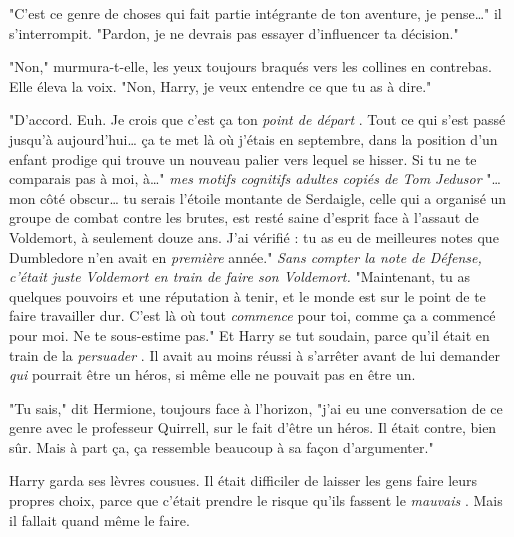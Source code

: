 "C'est ce genre de choses qui fait partie intégrante de ton aventure, je pense…" il s'interrompit. "Pardon, je ne devrais pas essayer d'influencer ta décision."

"Non," murmura-t-elle, les yeux toujours braqués vers les collines en contrebas. Elle éleva la voix. "Non, Harry, je veux entendre ce que tu as à dire."

"D'accord. Euh. Je crois que c'est ça ton \emph{point de départ} . Tout ce qui s'est passé jusqu'à aujourd'hui… ça te met là où j'étais en septembre, dans la position d'un enfant prodige qui trouve un nouveau palier vers lequel se hisser. Si tu ne te comparais pas à moi, à…" \emph{mes motifs cognitifs adultes copiés de Tom Jedusor}  "… mon côté obscur… tu serais l'étoile montante de Serdaigle, celle qui a organisé un groupe de combat contre les brutes, est resté saine d'esprit face à l'assaut de Voldemort, à seulement douze ans. J'ai vérifié : tu as eu de meilleures notes que Dumbledore n'en avait en \emph{première}  année." \emph{Sans compter la note de Défense, c'était juste Voldemort en train de faire son Voldemort.}  "Maintenant, tu as quelques pouvoirs et une réputation à tenir, et le monde est sur le point de te faire travailler dur. C'est là où tout \emph{commence}  pour toi, comme ça a commencé pour moi. Ne te sous-estime pas." Et Harry se tut soudain, parce qu'il était en train de la \emph{persuader} . Il avait au moins réussi à s'arrêter avant de lui demander \emph{qui}  pourrait être un héros, si même elle ne pouvait pas en être un.

"Tu sais," dit Hermione, toujours face à l'horizon, "j'ai eu une conversation de ce genre avec le professeur Quirrell, sur le fait d'être un héros. Il était contre, bien sûr. Mais à part ça, ça ressemble beaucoup à sa façon d'argumenter."

Harry garda ses lèvres cousues. Il était difficiler de laisser les gens faire leurs propres choix, parce que c'était prendre le risque qu'ils fassent le \emph{mauvais} . Mais il fallait quand même le faire.

